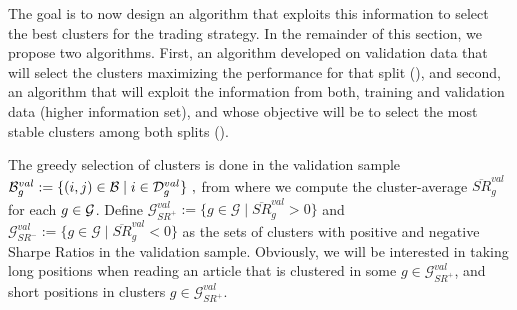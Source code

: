 \mx
The goal is to now design an algorithm that exploits this information to select the best clusters for the trading strategy. In the remainder of this section, we propose two algorithms. First, an algorithm developed on validation data that will select the clusters maximizing the performance for that split (), and second, an algorithm that will exploit the information from both, training and validation data (higher information set), and whose objective will be to select the most stable clusters among both splits (). 





The greedy selection of clusters is done in the validation sample 
$
\mathcal{B}_g^{val}:= \{
(i,j)\in\mathcal{B} 
 \mid 
  i \in \mathcal{D}_g^{val} \}
~,
$
from where we compute the cluster-average $\overline{S R}_g^{val}$ for each $g\in\mathcal{G}$.
%
Define $\mathcal G_{SR^+}^{val}:=\{ g\in \mathcal G \mid \overline{SR}_g^{val} >0\}$ and $\mathcal G_{SR^-}^{val}:=\{ g\in \mathcal G \mid \overline{SR}_g^{val} <0\}$ as the sets of clusters with positive and negative Sharpe Ratios in the validation sample. Obviously, we will be interested in taking long positions when reading an article that is clustered in some $g\in \mathcal G_{SR^+}^{val}$, and short positions in clusters $g\in \mathcal G_{SR^+}^{val}$. 


